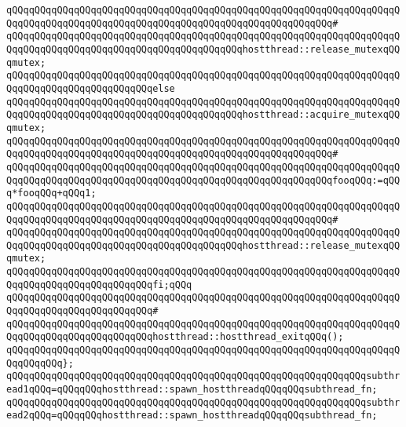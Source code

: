 \verb|qQQqqQQqqQQqqQQqqQQqqQQqqQQqqQQqqQQqqQQqqQQqqQQqqQQqqQQqqQQqqQQqqQQqqQQqqQQqqQQqqQQqqQQqqQQqqQQqqQQqqQQqqQQqqQQqqQQqqQQqqQQqqQQq#|\newline
\verb|qQQqqQQqqQQqqQQqqQQqqQQqqQQqqQQqqQQqqQQqqQQqqQQqqQQqqQQqqQQqqQQqqQQqqQQqqQQqqQQqqQQqqQQqqQQqqQQqqQQqqQQqqQQqqQQqhostthread::release_mutexqQQqmutex;|\newline
\verb|qQQqqQQqqQQqqQQqqQQqqQQqqQQqqQQqqQQqqQQqqQQqqQQqqQQqqQQqqQQqqQQqqQQqqQQqqQQqqQQqqQQqqQQqqQQqqQQqelse|\newline
\verb|qQQqqQQqqQQqqQQqqQQqqQQqqQQqqQQqqQQqqQQqqQQqqQQqqQQqqQQqqQQqqQQqqQQqqQQqqQQqqQQqqQQqqQQqqQQqqQQqqQQqqQQqqQQqqQQqhostthread::acquire_mutexqQQqmutex;|\newline
\verb|qQQqqQQqqQQqqQQqqQQqqQQqqQQqqQQqqQQqqQQqqQQqqQQqqQQqqQQqqQQqqQQqqQQqqQQqqQQqqQQqqQQqqQQqqQQqqQQqqQQqqQQqqQQqqQQqqQQqqQQqqQQqqQQq#|\newline
\verb|qQQqqQQqqQQqqQQqqQQqqQQqqQQqqQQqqQQqqQQqqQQqqQQqqQQqqQQqqQQqqQQqqQQqqQQqqQQqqQQqqQQqqQQqqQQqqQQqqQQqqQQqqQQqqQQqqQQqqQQqqQQqqQQqfooqQQq:=qQQq*fooqQQq+qQQq1;|\newline
\verb|qQQqqQQqqQQqqQQqqQQqqQQqqQQqqQQqqQQqqQQqqQQqqQQqqQQqqQQqqQQqqQQqqQQqqQQqqQQqqQQqqQQqqQQqqQQqqQQqqQQqqQQqqQQqqQQqqQQqqQQqqQQqqQQq#|\newline
\verb|qQQqqQQqqQQqqQQqqQQqqQQqqQQqqQQqqQQqqQQqqQQqqQQqqQQqqQQqqQQqqQQqqQQqqQQqqQQqqQQqqQQqqQQqqQQqqQQqqQQqqQQqqQQqqQQqhostthread::release_mutexqQQqmutex;|\newline
\verb|qQQqqQQqqQQqqQQqqQQqqQQqqQQqqQQqqQQqqQQqqQQqqQQqqQQqqQQqqQQqqQQqqQQqqQQqqQQqqQQqqQQqqQQqqQQqqQQqfi;qQQq|\newline
\verb|qQQqqQQqqQQqqQQqqQQqqQQqqQQqqQQqqQQqqQQqqQQqqQQqqQQqqQQqqQQqqQQqqQQqqQQqqQQqqQQqqQQqqQQqqQQqqQQq#|\newline
\verb|qQQqqQQqqQQqqQQqqQQqqQQqqQQqqQQqqQQqqQQqqQQqqQQqqQQqqQQqqQQqqQQqqQQqqQQqqQQqqQQqqQQqqQQqqQQqqQQqhostthread::hostthread_exitqQQq();|\newline
\verb|qQQqqQQqqQQqqQQqqQQqqQQqqQQqqQQqqQQqqQQqqQQqqQQqqQQqqQQqqQQqqQQqqQQqqQQqqQQqqQQq};|\newline
\newline
\verb|qQQqqQQqqQQqqQQqqQQqqQQqqQQqqQQqqQQqqQQqqQQqqQQqqQQqqQQqqQQqqQQqsubthread1qQQq=qQQqqQQqhostthread::spawn_hostthreadqQQqqQQqsubthread_fn;|\newline
\verb|qQQqqQQqqQQqqQQqqQQqqQQqqQQqqQQqqQQqqQQqqQQqqQQqqQQqqQQqqQQqqQQqsubthread2qQQq=qQQqqQQqhostthread::spawn_hostthreadqQQqqQQqsubthread_fn;|\newline
